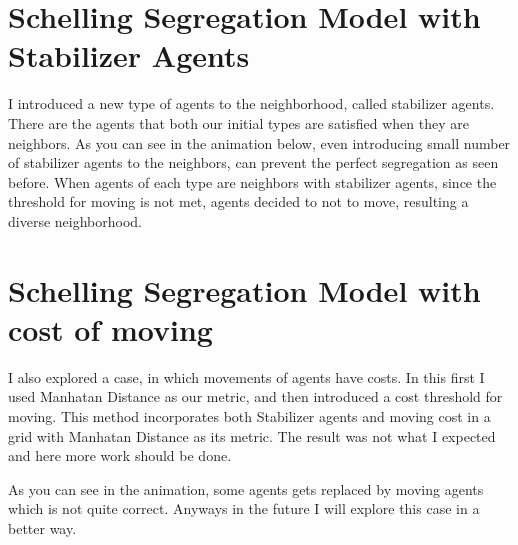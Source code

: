 \documentclass{article}
\begin{document}
\section{Schelling Segregation Model with Stabilizer Agents}
I introduced a new type of agents to the neighborhood, called stabilizer agents. There are the agents that both our initial types are satisfied when they are neighbors. As you can see in the animation below, even introducing small number of stabilizer agents to the neighbors, can prevent the perfect segregation as seen before. When agents of each type are neighbors with stabilizer agents, since the threshold for moving is not met, agents decided to not to move, resulting a diverse neighborhood.

\section{Schelling Segregation Model with cost of moving}
I also explored a case, in which movements of agents have costs. In this first I used Manhatan Distance as our metric, and then introduced a cost threshold for moving. This method incorporates both Stabilizer agents and moving cost in a grid with Manhatan Distance as its metric. The result was not what I expected and here more work should be done.

As you can see in the animation, some agents gets replaced by moving agents which is not quite correct. Anyways in the future I will explore this case in a better way.
\end{document}

